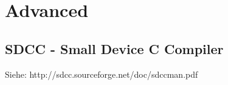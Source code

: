 \documentclass{article}
\begin{document}
\section{Advanced}

\subsection{SDCC - Small Device C Compiler}

Siehe: http://sdcc.sourceforge.net/doc/sdccman.pdf
\end{document}
